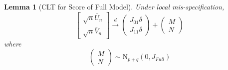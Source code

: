\documentclass[12pt]{article}
\newtheorem{lem}{Lemma}
\theoremstyle{definition}
\begin{document}
\begin{lem}[CLT for Score of Full Model]
\label{lem:score}
Under local mis-specification,
$$\left[\begin{array}{c}
\sqrt{n} \bar{U}_n \\ \sqrt{n} \bar{V}_n
\end{array}\right] \overset{d}{\rightarrow}
\left(\begin{array}{c}
J_{01}\delta\\
J_{11}\delta
\end{array}\right) +
\left(\begin{array}{c}
M\\
N
\end{array}\right)$$
where
$$\left(\begin{array}{c}
M\\
N
\end{array}\right) \sim \mbox{N}_{p+q}(0, J_{Full})$$
\end{lem}
\end{document}
